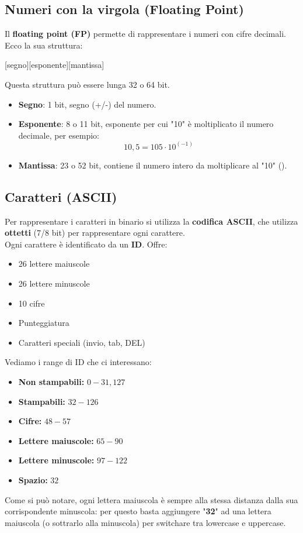 \documentclass[12pt,a4paper]{article}
\begin{document}
\subsection{Numeri con la virgola (Floating Point)}
Il \textbf{floating point (FP)} permette di rappresentare i numeri con cifre decimali.\\
Ecco la sua struttura:
\begin{center}
    [segno][esponente][mantissa]
\end{center}
Questa struttura può essere lunga 32 o 64 bit.
\begin{itemize}
    \item \textbf{Segno}: 1 bit, segno (+/-) del numero.
    \item \textbf{Esponente}: 8 o 11 bit, esponente per cui "10" è moltiplicato il numero decimale, per esempio:
    \[
    10,5 = 105 \cdot 10^(-1)
    \]
    \item \textbf{Mantissa}: 23 o 52 bit, contiene il numero intero da moltiplicare al "10" ().
\end{itemize}
\subsection{Caratteri (ASCII)}
Per rappresentare i caratteri in binario si utilizza la \textbf{codifica ASCII}, che utilizza \textbf{ottetti} (7/8 bit) per rappresentare ogni carattere.\\
Ogni carattere è identificato da un \textbf{ID}.
Offre:
\begin{itemize}
    \item 26 lettere maiuscole
    \item 26 lettere minuscole
    \item 10 cifre
    \item Punteggiatura
    \item Caratteri speciali (invio, tab, DEL)
\end{itemize}
Vediamo i range di ID che ci interessano:
\begin{itemize}
    \item \textbf{Non stampabili:} \(0 - 31, 127\)
    \item \textbf{Stampabili:} \(32 - 126\)
    \item \textbf{Cifre:} \(48 - 57\)
    \item \textbf{Lettere maiuscole:} \(65 - 90\)
    \item \textbf{Lettere minuscole:} \(97 - 122\)
    \item \textbf{Spazio:} \(32\)
\end{itemize}
Come si può notare, ogni lettera maiuscola è sempre alla stessa distanza dalla sua corrispondente minuscola: per questo basta aggiungere "\textbf{32}" ad una lettera maiuscola (o sottrarlo alla minuscola) per switchare tra lowercase e uppercase.
\end{document}
